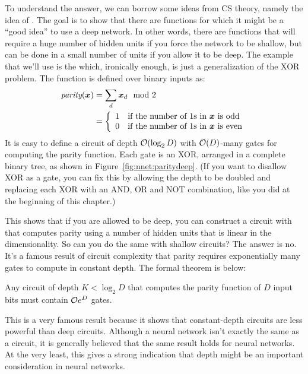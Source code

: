 To understand the answer, we can borrow some ideas from CS theory,
namely the idea of .  The goal is to show
that there are functions for which it might be a ``good idea'' to use
a deep network.  In other words, there are functions that will require
a huge number of hidden units if you force the network to be shallow,
but can be done in a small number of units if you allow it to be
deep.  The example that we'll use is the 
which, ironically enough, is just a generalization of the XOR
problem.  The function is defined over binary inputs as:
%
\begin{align}
\textit{parity}({\boldsymbol{x}})
&= \sum_d {\boldsymbol{x}}_d \mod 2 \\
&= \left\{\begin{array}{ll} 1 & \text{if the number of $1$s in ${\boldsymbol{x}}$ is odd} \\
           0 & \text{if the number of $1$s in ${\boldsymbol{x}}$ is even} \end{array}\right.
\end{align}
%
%
It is easy to define a circuit of depth $\mathcal{O}(\log_2 D)$ with
$\mathcal{O}(D)$-many gates for computing the parity function.  Each gate is
an XOR, arranged in a complete binary tree, as shown in
Figure~\ref{fig:nnet:paritydeep}.  (If you want to disallow XOR as a
gate, you can fix this by allowing the depth to be doubled and
replacing each XOR with an AND, OR and NOT combination, like you did
at the beginning of this chapter.)

This shows that if you are allowed to be deep, you can construct a
circuit with that computes parity using a number of hidden units that
is linear in the dimensionality.  So can you do the same with shallow
circuits?  The answer is no.  It's a famous result of circuit
complexity that parity requires exponentially many gates to compute in
constant depth.  The formal theorem is below:

\begin{theorem} \label{thm:nnet:parity}
  Any circuit of depth $K < \log_2 D$ that computes the parity
  function of $D$ input bits must contain $\mathcal{O}{e^D}$ gates.
\end{theorem}

This is a very famous result because it shows that constant-depth
circuits are less powerful than deep circuits.  Although a neural
network isn't exactly the same as a circuit, it is generally believed
that the same result holds for neural networks.  At the very least,
this gives a strong indication that depth might be an important
consideration in neural networks.

